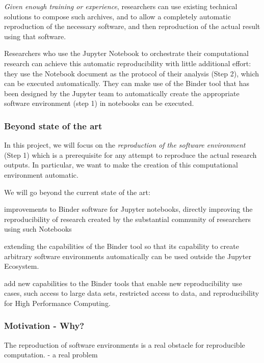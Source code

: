 \emph{Given enough training or experience}, researchers can use existing technical
solutions to compose such archives, and to allow a completely automatic
reproduction of the necessary software, and then reproduction of the actual
result using that software. 

\medskip Researchers who use the Jupyter Notebook to orchestrate their
computational research can achieve this automatic reproducibility with little
additional effort: they use the Notebook document as the protocol of their
analysis (Step 2), which can be executed automatically. They can make use of the
Binder tool that has been designed by the Jupyter team to automatically create
the appropriate software environment (step 1) in notebooks can be executed.

\subsubsection{Beyond state of the art}

In this project, we will focus on the \emph{reproduction of the
  software environment} (Step 1) which is a prerequisite for any attempt to
reproduce the actual research outputs. In particular, we want to make the
creation of this computational environment automatic.

We will go beyond the current state of the art:
\begin{compactitem}
\item improvements to Binder software for Jupyter notebooks, directly improving
  the reproducibility of research created by the substantial community of
  researchers using such Notebooks
\item extending the capabilities of the Binder tool so that its capability to
  create arbitrary software environments automatically can be used outside the
  Jupyter Ecosystem.
\item add new capabilities to the Binder tools that enable new reproducibility
  use cases, such access to large data sets, restricted access to data,
  and reproducibility for High Performance Computing.
\end{compactitem}

\subsubsection{Motivation - Why?}

The reproduction of software environments is a real obstacle for reproducible computation.
- a real problem


